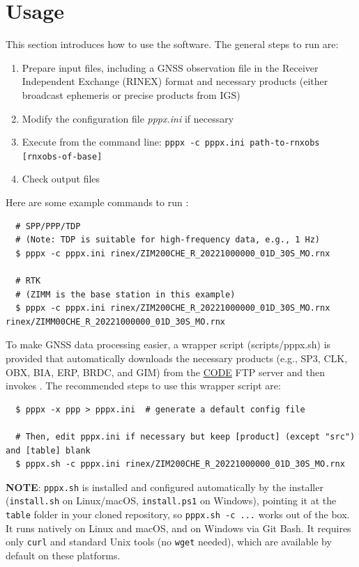 \section{Usage}
\label{sec:usage}

This section introduces how to use the \pppx{} software. The general steps to run \pppx{} are:
\begin{enumerate}
    \item Prepare input files, including a GNSS observation file in the Receiver Independent
          Exchange (RINEX) format and necessary products
          (either broadcast ephemeris or precise products from IGS)
    \item Modify the configuration file \textit{pppx.ini} if necessary
    \item Execute \pppx{} from the command line: \newline
    \texttt{pppx -c pppx.ini path-to-rnxobs [rnxobs-of-base]}
    \item Check output files
\end{enumerate}

Here are some example commands to run \pppx{}:
\begin{verbatim}
  # SPP/PPP/TDP
  # (Note: TDP is suitable for high-frequency data, e.g., 1 Hz)
  $ pppx -c pppx.ini rinex/ZIM200CHE_R_20221000000_01D_30S_MO.rnx

  # RTK
  # (ZIMM is the base station in this example)
  $ pppx -c pppx.ini rinex/ZIM200CHE_R_20221000000_01D_30S_MO.rnx rinex/ZIMM00CHE_R_20221000000_01D_30S_MO.rnx
\end{verbatim}

To make GNSS data processing easier, a wrapper script (scripts/pppx.sh) is provided that
automatically downloads the necessary products (e.g., SP3, CLK, OBX, BIA, ERP, BRDC, and GIM)
from the \href{ftp://ftp.aiub.unibe.ch/CODE}{CODE} FTP server and then invokes \pppx{}.
The recommended steps to use this wrapper script are:
\begin{verbatim}
  $ pppx -x ppp > pppx.ini  # generate a default config file

  # Then, edit pppx.ini if necessary but keep [product] (except "src") and [table] blank
  $ pppx.sh -c pppx.ini rinex/ZIM200CHE_R_20221000000_01D_30S_MO.rnx
\end{verbatim}

\textbf{NOTE}: \texttt{pppx.sh} is installed and configured automatically by the installer
(\texttt{install.sh} on Linux/macOS, \texttt{install.ps1} on Windows), pointing it at the
\texttt{table} folder in your cloned repository, so \texttt{pppx.sh -c ...} works out of the
box. It runs natively on Linux and macOS, and on Windows via Git Bash. It requires only
\texttt{curl} and standard Unix tools (no \texttt{wget} needed), which are available by
default on these platforms.



